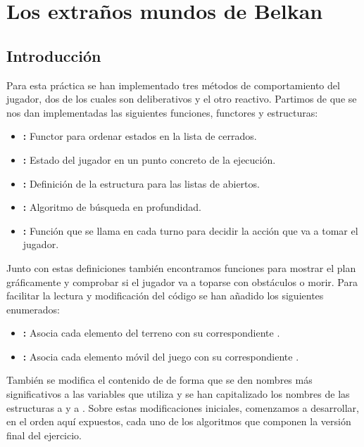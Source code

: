 \chapter{Los extraños mundos de Belkan}\label{belkan}

\section{Introducción}\label{belkan-intro}

Para esta práctica se han implementado tres métodos de comportamiento del jugador, dos de los cuales son deliberativos y el otro reactivo.
Partimos de que se nos dan implementadas las siguientes funciones, functores y estructuras:

\begin{itemize}
	\item{}\textbf{:} Functor para ordenar estados en la lista de cerrados.
	\item{}\textbf{:} Estado del jugador en un punto concreto de la ejecución.
	\item{}\textbf{:} Definición de la estructura  para las listas de abiertos.
	\item{}\textbf{:} Algoritmo de búsqueda en profundidad.
	\item{}\textbf{:} Función que se llama en cada turno para decidir la acción que va a tomar el jugador.
\end{itemize}

Junto con estas definiciones también encontramos funciones para mostrar el plan gráficamente y comprobar si el jugador va a toparse con obstáculos o morir.
Para facilitar la lectura y modificación del código se han añadido los siguientes enumerados:

\begin{itemize}
	\item{}\textbf{:} Asocia cada elemento del terreno con su correspondiente .
	\item{}\textbf{:} Asocia cada elemento móvil del juego con su correspondiente .
\end{itemize}

También se modifica el contenido de  de forma que se den nombres más significativos a las variables que utiliza y se han capitalizado los nombres de las estructuras  a  y  a .
Sobre estas modificaciones iniciales, comenzamos a desarrollar, en el orden aquí expuestos, cada uno de los algoritmos que componen la versión final del ejercicio.

